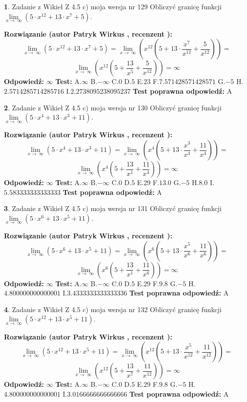 \documentclass[12pt, a4paper]{article}
\theoremstyle{definition} %
\newtheorem{zad}{}
\newcommand{\zadStart}[1]{\begin{zad}#1\newline}
\newcommand{\zadStop}{\end{zad}}
\newcommand{\rozwStart}[2]{\noindent \textbf{Rozwiązanie (autor #1 , recenzent #2): }\newline}
\newcommand{\rozwStop}{\newline}
\newcommand{\odpStart}{\noindent \textbf{Odpowiedź:}\newline}
\newcommand{\odpStop}{\newline}
\newcommand{\testStart}{\noindent \textbf{Test:}\newline}
\newcommand{\testStop}{\newline}
\newcommand{\kluczStart}{\noindent \textbf{Test poprawna odpowiedź:}\newline}
\newcommand{\kluczStop}{\newline}
\begin{document}
\zadStart{Zadanie z Wikieł Z 4.5 c) moja wersja nr 129}
Obliczyć granicę funkcji  $\lim\limits_{x\to\ \infty}(5 \cdot x^{12}+13 \cdot x^{7}+5)$.
\zadStop
\rozwStart{Patryk Wirkus}{}
$$\lim\limits_{x\to\ \infty}(5 \cdot x^{12}+13 \cdot x^{7}+5) = \lim\limits_{x\to\ \infty}(x^{12}(5 +13 \cdot \frac{x^{7}}{x^{12}}+\frac{5}{x^{12}})) =$$ $$\lim\limits_{x\to\ \infty}(x^{12}(5 +\frac{13}{x^{5}}+\frac{5}{x^{12}})) =\infty$$
\rozwStop
\odpStart
$\infty$
\odpStop
\testStart
A.$\infty$ B.$-\infty$ C.$0$ D.$5$ E.$23$
F.$7.571428571428571$ G.$-5$
H.$2.5714285714285716$
I.$2.2738095238095237$
\testStop
\kluczStart
A
\kluczStop



\zadStart{Zadanie z Wikieł Z 4.5 c) moja wersja nr 130}
Obliczyć granicę funkcji  $\lim\limits_{x\to\ \infty}(5 \cdot x^{4}+13 \cdot x^{3}+11)$.
\zadStop
\rozwStart{Patryk Wirkus}{}
$$\lim\limits_{x\to\ \infty}(5 \cdot x^{4}+13 \cdot x^{3}+11) = \lim\limits_{x\to\ \infty}(x^{4}(5 +13 \cdot \frac{x^{3}}{x^{4}}+\frac{11}{x^{4}})) =$$ $$\lim\limits_{x\to\ \infty}(x^{4}(5 +\frac{13}{x^{1}}+\frac{11}{x^{4}})) =\infty$$
\rozwStop
\odpStart
$\infty$
\odpStop
\testStart
A.$\infty$ B.$-\infty$ C.$0$ D.$5$ E.$29$
F.$13.0$ G.$-5$
H.$8.0$
I.$5.583333333333333$
\testStop
\kluczStart
A
\kluczStop



\zadStart{Zadanie z Wikieł Z 4.5 c) moja wersja nr 131}
Obliczyć granicę funkcji  $\lim\limits_{x\to\ \infty}(5 \cdot x^{6}+13 \cdot x^{5}+11)$.
\zadStop
\rozwStart{Patryk Wirkus}{}
$$\lim\limits_{x\to\ \infty}(5 \cdot x^{6}+13 \cdot x^{5}+11) = \lim\limits_{x\to\ \infty}(x^{6}(5 +13 \cdot \frac{x^{5}}{x^{6}}+\frac{11}{x^{6}})) =$$ $$\lim\limits_{x\to\ \infty}(x^{6}(5 +\frac{13}{x^{1}}+\frac{11}{x^{6}})) =\infty$$
\rozwStop
\odpStart
$\infty$
\odpStop
\testStart
A.$\infty$ B.$-\infty$ C.$0$ D.$5$ E.$29$
F.$9.8$ G.$-5$
H.$4.800000000000001$
I.$3.4333333333333336$
\testStop
\kluczStart
A
\kluczStop



\zadStart{Zadanie z Wikieł Z 4.5 c) moja wersja nr 132}
Obliczyć granicę funkcji  $\lim\limits_{x\to\ \infty}(5 \cdot x^{12}+13 \cdot x^{5}+11)$.
\zadStop
\rozwStart{Patryk Wirkus}{}
$$\lim\limits_{x\to\ \infty}(5 \cdot x^{12}+13 \cdot x^{5}+11) = \lim\limits_{x\to\ \infty}(x^{12}(5 +13 \cdot \frac{x^{5}}{x^{12}}+\frac{11}{x^{12}})) =$$ $$\lim\limits_{x\to\ \infty}(x^{12}(5 +\frac{13}{x^{7}}+\frac{11}{x^{12}})) =\infty$$
\rozwStop
\odpStart
$\infty$
\odpStop
\testStart
A.$\infty$ B.$-\infty$ C.$0$ D.$5$ E.$29$
F.$9.8$ G.$-5$
H.$4.800000000000001$
I.$3.0166666666666666$
\testStop
\kluczStart
A
\kluczStop
\end{document}
